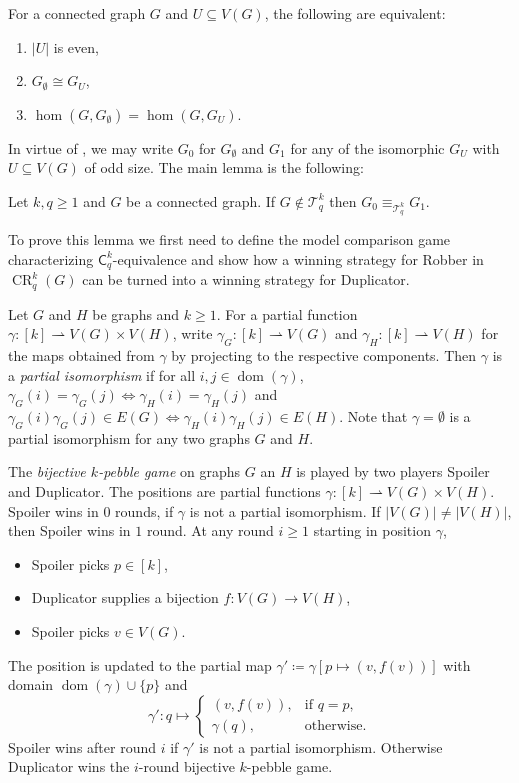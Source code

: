 \documentclass{lmcs}
\theoremstyle{plain}\newtheorem{claim}[thm]{Claim}   %
\newcommand{\cT}{\ensuremath{\mathcal T}}
\DeclareMathOperator{\CR}{CR}
\DeclareMathOperator{\dom}{dom}
\newcommand{\Ekq}{\ensuremath{\cT_{q}^{k}}}
\begin{document}
\begin{lemC} \label{lem:roberson3.7}
	For a connected graph $G$ and $U \subseteq V(G)$, the following are equivalent:
	\begin{enumerate}
		\item $|U|$ is even,
		\item $G_\emptyset \cong G_U$,
		\item $\hom(G, G_\emptyset) = \hom(G, G_U)$.
	\end{enumerate}
\end{lemC}

In virtue of \cite[Lemma~3.2]{roberson_oddomorphisms_2022}, we may write $G_0$ for $G_\emptyset$ and $G_1$ for any of the isomorphic $G_U$ with $U \subseteq V(G)$ of odd size.
The main lemma is the following:

\begin{lem}\label{prop:closedness-ekq-core}
	Let $k,q \geq 1$ and $G$ be a connected graph.
	If $G \notin \Ekq$ then $G_0 \equiv_{\Ekq} G_1$.
\end{lem}

To prove this lemma we first need to define the model comparison game characterizing $\mathsf{C}^k_q$-equivalence and show how a winning strategy for Robber in $\CR^k_q(G)$ can be turned into a winning strategy for Duplicator.

Let $G$ and $H$ be graphs and $k \geq 1$.
For a partial function $\gamma \colon [k] \rightharpoonup V(G) \times V(H)$, write $\gamma_G \colon [k] \rightharpoonup V(G)$ and $\gamma_H \colon [k] \rightharpoonup V(H)$ for the maps obtained from $\gamma$ by projecting to the respective components.
Then $\gamma$ is a \emph{partial isomorphism} if for all $i, j \in \dom(\gamma)$, $\gamma_G(i) = \gamma_G(j) \Leftrightarrow \gamma_H(i) = \gamma_H(j)$ and $\gamma_G(i)\gamma_G(j) \in E(G) \Leftrightarrow \gamma_H(i)\gamma_H(j) \in E(H)$.
Note that $\gamma = \emptyset$ is a partial isomorphism for any two graphs $G$ and $H$.

The \emph{bijective $k$-pebble game} on graphs $G$ an $H$ is played by two players Spoiler and Duplicator.
The positions are partial functions $\gamma \colon [k] \rightharpoonup V(G) \times V(H)$.
Spoiler wins in $0$ rounds, if $\gamma$ is not a partial isomorphism.
If $|V(G)| \neq |V(H)|$, then Spoiler wins in $1$ round.
At any round $i \geq 1$ starting in position $\gamma$,
\begin{itemize}
	\item Spoiler picks $p \in [k]$,
	\item Duplicator supplies a bijection $f \colon V(G) \to V(H)$,
	\item Spoiler picks $v \in V(G)$.
\end{itemize}
The position is updated to the partial map $\gamma' \coloneqq \gamma[p \mapsto (v, f(v))]$ with domain $\dom(\gamma) \cup \{p\}$ and
\[
\gamma' \colon q \mapsto \begin{cases}
	(v, f(v)), & \text{if } q = p,\\
	\gamma(q), & \text{otherwise}.
\end{cases}
\]
Spoiler wins after round $i$ if $\gamma'$ is not a partial isomorphism.
Otherwise Duplicator wins the $i$-round bijective $k$-pebble game.
\end{document}
